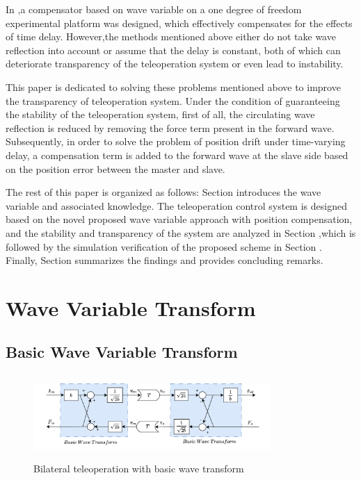 In \cite{b12},a compensator based on wave variable
on a one degree of freedom experimental platform was designed,
which effectively compensates for the effects of time delay.
However,the methods mentioned above either do not take wave reflection into account
or assume that the delay is constant,
both of which can deteriorate transparency of the teleoperation system
or even lead to instability.
\par This paper is dedicated to solving these problems mentioned 
above to improve the transparency of teleoperation system.
Under the condition of guaranteeing the stability of the teleoperation system,
first of all, the circulating wave reflection is reduced 
by removing the force term present in the forward wave. 
Subsequently, in order to solve the problem of position drift under time-varying delay,
a compensation term is added to the forward wave at the slave side 
based on the position error between the master and slave.
\par The rest of this paper is organized as follows:
Section \uppercase\expandafter{} introduces the wave variable and associated knowledge.
The teleoperation control system is designed based on the novel proposed wave variable approach
with position compensation, and the stability and transparency of the system are analyzed 
in Section \uppercase\expandafter{},which is
followed by the simulation verification of the proposed scheme in Section \uppercase\expandafter{}.
Finally, Section \uppercase\expandafter{} summarizes the findings and provides concluding remarks.


\section{Wave Variable Transform}

\subsection{Basic Wave Variable Transform}
\begin{figure}[htbp]
    \centerline{\includegraphics[height=3.2cm,width=9cm]{basic_wave.jpg}}
    \caption{Bilateral teleoperation with basic wave transform}
    \label{fig1}
\end{figure}

